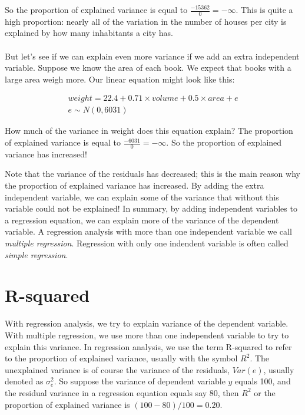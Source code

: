 \documentclass[]{report}\usepackage[]{graphicx}\usepackage[]{color}
\begin{document}
So the proportion of explained variance is equal to $ \frac{-15362}{0}=\ensuremath{-\infty{}}$. This is quite a high proportion: nearly all of the variation in the number of houses per city is explained by how many inhabitants a city has.
\\
\\
But let's see if we can explain even more variance if we add an extra independent variable. Suppose we know the area of each book. We expect that books with a large area weigh more. Our linear equation might look like this:


\begin{eqnarray}
weight = 22.4 + 0.71 \times volume + 0.5 \times  area + e \\
e \sim N(0, 6031)
\end{eqnarray}

How much of the variance in weight does this equation explain? The proportion of explained variance is equal to $ \frac{-6031}{0}=\ensuremath{-\infty{}}$. So the proportion of explained variance has increased!

Note that the variance of the residuals has decreased; this is the main reason why the proportion of explained variance has increased. By adding the extra independent variable, we can explain some of the variance that without this variable could not be explained! In summary, by adding independent variables to a regression equation, we can explain more of the variance of the dependent variable. A regression analysis with more than one independent variable we call \textit{multiple regression}. Regression with only one indendent variable is often called \textit{simple regression}.







\section{R-squared}

With regression analysis, we try to explain variance of the dependent variable. With multiple regression, we use more than one independent variable to try to explain this variance. In regression analysis, we use the term R-squared to refer to the proportion of explained variance, usually with the symbol $R^2$. The unexplained variance is of course the variance of the residuals, $Var(e)$, usually denoted as $\sigma_e^2$. So suppose the variance of dependent variable $y$ equals 100, and the residual variance in a regression equation equals say 80, then $R^2$ or the proportion of explained variance is $(100-80)/100=0.20$.
\end{document}

